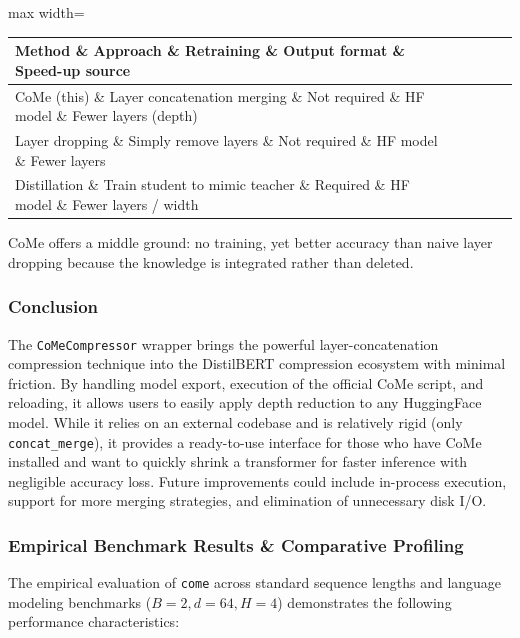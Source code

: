 \begin{center}
\begin{adjustbox}{max width=\columnwidth}
\renewcommand{\arraystretch}{1.2}
\begin{tabular}{lllll}
\toprule
Method \& Approach \& Retraining \& Output format \& Speed-up source \\
\midrule
CoMe (this) \& Layer concatenation merging \& Not required \& HF model \& Fewer layers (depth) \\
Layer dropping \& Simply remove layers \& Not required \& HF model \& Fewer layers \\
Distillation \& Train student to mimic teacher \& Required \& HF model \& Fewer layers / width \\

\bottomrule
\end{tabular}
\end{adjustbox}
\end{center}
CoMe offers a middle ground: no training, yet better accuracy than naive layer dropping because the knowledge is integrated rather than deleted.


\subsubsection*{Conclusion}

The \texttt{CoMeCompressor} wrapper brings the powerful layer-concatenation compression technique into the DistilBERT compression ecosystem with minimal friction. By handling model export, execution of the official CoMe script, and reloading, it allows users to easily apply depth reduction to any HuggingFace model. While it relies on an external codebase and is relatively rigid (only \texttt{concat\_merge}), it provides a ready-to-use interface for those who have CoMe installed and want to quickly shrink a transformer for faster inference with negligible accuracy loss. Future improvements could include in-process execution, support for more merging strategies, and elimination of unnecessary disk I/O.

\subsubsection*{Empirical Benchmark Results \& Comparative Profiling}

The empirical evaluation of \texttt{come} across standard sequence lengths and language modeling benchmarks ($B=2, d=64, H=4$) demonstrates the following performance characteristics:

